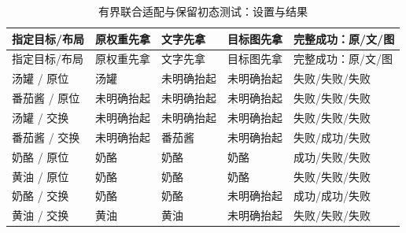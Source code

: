 \FloatBarrier\begingroup\small\setlength{\tabcolsep}{2.5pt}
\begin{longtable}[]{@{}
  >{\raggedright\arraybackslash}p{}
  >{\raggedright\arraybackslash}p{}
  >{\raggedright\arraybackslash}p{}
  >{\raggedright\arraybackslash}p{}
  >{\raggedright\arraybackslash}p{}@{}}
\caption{有界联合适配与保留初态测试：设置与结果}\label{tab:s14-9}\tabularnewline
\toprule\noalign{}
\begin{minipage}[b]{\linewidth}\raggedright
指定目标/布局
\end{minipage} & \begin{minipage}[b]{\linewidth}\raggedright
原权重先拿
\end{minipage} & \begin{minipage}[b]{\linewidth}\raggedright
文字先拿
\end{minipage} & \begin{minipage}[b]{\linewidth}\raggedright
目标图先拿
\end{minipage} & \begin{minipage}[b]{\linewidth}\raggedright
完整成功：原/文/图
\end{minipage} \\
\midrule\noalign{}
\endfirsthead
\toprule\noalign{}
\begin{minipage}[b]{\linewidth}\raggedright
指定目标/布局
\end{minipage} & \begin{minipage}[b]{\linewidth}\raggedright
原权重先拿
\end{minipage} & \begin{minipage}[b]{\linewidth}\raggedright
文字先拿
\end{minipage} & \begin{minipage}[b]{\linewidth}\raggedright
目标图先拿
\end{minipage} & \begin{minipage}[b]{\linewidth}\raggedright
完整成功：原/文/图
\end{minipage} \\
\midrule\noalign{}
\endhead
\bottomrule\noalign{}
\endlastfoot
汤罐 / 原位 & 汤罐 & 未明确抬起 & 未明确抬起 & 失败/失败/失败 \\
番茄酱 / 原位 & 未明确抬起 & 未明确抬起 & 未明确抬起 & 失败/失败/失败 \\
汤罐 / 交换 & 未明确抬起 & 未明确抬起 & 未明确抬起 & 失败/失败/失败 \\
番茄酱 / 交换 & 未明确抬起 & 番茄酱 & 未明确抬起 & 失败/成功/失败 \\
奶酪 / 原位 & 奶酪 & 奶酪 & 奶酪 & 成功/失败/失败 \\
黄油 / 原位 & 奶酪 & 奶酪 & 奶酪 & 失败/失败/失败 \\
奶酪 / 交换 & 奶酪 & 奶酪 & 未明确抬起 & 成功/成功/失败 \\
黄油 / 交换 & 黄油 & 黄油 & 未明确抬起 & 失败/失败/失败 \\
\end{longtable}\endgroup

